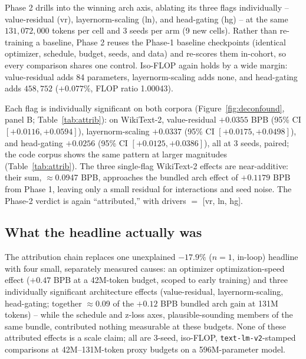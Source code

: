 Phase 2 drills into the winning arch axis, ablating its three flags
individually -- value-residual (vr), layernorm-scaling (ln), and head-gating
(hg) -- at the same $131{,}072{,}000$ tokens per cell and 3 seeds per arm
(9 new cells). Rather than re-training a baseline, Phase 2 reuses the
Phase-1 baseline checkpoints (identical optimizer, schedule, budget, seeds,
and data) and re-scores them in-cohort, so every comparison shares one
control. Iso-FLOP again holds by a wide margin: value-residual adds 84
parameters, layernorm-scaling adds none, and head-gating adds $458{,}752$
($+0.077\%$, FLOP ratio 1.00043).

Each flag is individually significant on both corpora
(Figure~\ref{fig:deconfound}, panel B; Table~\ref{tab:attrib}): on WikiText-2,
value-residual $+0.0355$ BPB (95\% CI $[+0.0116, +0.0594]$),
layernorm-scaling $+0.0337$ (95\% CI $[+0.0175, +0.0498]$), and head-gating
$+0.0256$ (95\% CI $[+0.0125, +0.0386]$), all at 3 seeds, paired; the code
corpus shows the same pattern at larger magnitudes (Table~\ref{tab:attrib}).
The three single-flag WikiText-2 effects are near-additive: their sum,
$\approx$0.0947 BPB, approaches the bundled arch effect of $+0.1179$ BPB from
Phase 1, leaving only a small residual for interactions and seed noise. The
Phase-2 verdict is again ``attributed,'' with drivers $=$ [vr, ln, hg].

\subsection{What the headline actually was}\label{sec:pretrain-summary}

The attribution chain replaces one unexplained $-17.9\%$ ($n{=}1$, in-loop)
headline with four small, separately measured causes: an optimizer
optimization-speed effect ($+0.47$ BPB at a 42M-token budget, scoped to early
training) and three individually significant architecture effects
(value-residual, layernorm-scaling, head-gating; together $\approx$0.09 of
the $+0.12$ BPB bundled arch gain at 131M tokens) -- while the schedule and
z-loss axes, plausible-sounding members of the same bundle, contributed
nothing measurable at these budgets. None of these attributed effects is a
scale claim; all are 3-seed, iso-FLOP, \texttt{text-lm-v2}-stamped
comparisons at 42M--131M-token proxy budgets on a 596M-parameter model.

